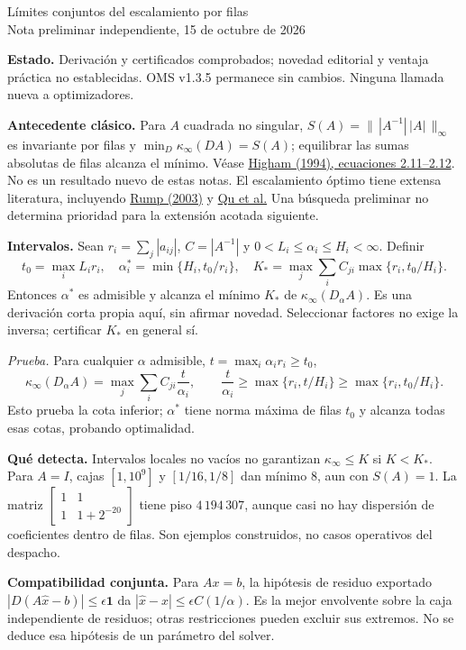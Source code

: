 \documentclass[11pt,a4paper]{article}
\begin{document}
\begin{center}{\Large Límites conjuntos del escalamiento por filas}\\[3pt]
Nota preliminar independiente, 15 de octubre de 2026\end{center}
\textbf{Estado.} Derivación y certificados comprobados; novedad editorial y
ventaja práctica no establecidas. OMS v1.3.5 permanece sin cambios. Ninguna
llamada nueva a optimizadores.

\textbf{Antecedente clásico.} Para $A$ cuadrada no singular,
$S(A)=\|\,|A^{-1}|\,|A|\,\|_\infty$ es invariante por filas y
$\min_D\kappa_\infty(DA)=S(A)$; equilibrar las sumas absolutas de filas alcanza
el mínimo. Véase \href{https://eprints.maths.manchester.ac.uk/651/1/SURVEY.pdf}{Higham (1994), ecuaciones 2.11--2.12}.
No es un resultado nuevo de estas notas. El escalamiento óptimo tiene extensa
literatura, incluyendo \href{https://www.tuhh.de/ti3/paper/rump/Ru03a.pdf}{Rump (2003)}
y \href{https://arxiv.org/abs/2209.00809}{Qu et al.} Una búsqueda preliminar no
determina prioridad para la extensión acotada siguiente.

\textbf{Intervalos.} Sean $r_i=\sum_j|a_{ij}|$, $C=|A^{-1}|$ y
$0<L_i\leq\alpha_i\leq H_i<\infty$. Definir
\[
 t_0=\max_i L_i r_i,\quad
 \alpha_i^*=\min\{H_i,t_0/r_i\},\quad
 K_* = \max_j\sum_i C_{ji}\max\{r_i,t_0/H_i\}.
\]
Entonces $\alpha^*$ es admisible y alcanza el mínimo $K_*$ de
$\kappa_\infty(D_\alpha A)$. Es una derivación corta propia aquí, sin afirmar
novedad. Seleccionar factores no exige la inversa; certificar $K_*$ en general sí.

\emph{Prueba.} Para cualquier $\alpha$ admisible, $t=\max_i\alpha_i r_i\geq t_0$,
\[
 \kappa_\infty(D_\alpha A)=\max_j\sum_i C_{ji}\frac{t}{\alpha_i},\qquad
 \frac{t}{\alpha_i}\geq\max\{r_i,t/H_i\}\geq\max\{r_i,t_0/H_i\}.
\]
Esto prueba la cota inferior; $\alpha^*$ tiene norma máxima de filas $t_0$
y alcanza todas esas cotas, probando optimalidad.

\textbf{Qué detecta.} Intervalos locales no vacíos no garantizan
$\kappa_\infty\leq K$ si $K<K_*$. Para $A=I$, cajas $[1,10^9]$ y
$[1/16,1/8]$ dan mínimo $8$, aun con $S(A)=1$. La matriz
$\left[\begin{smallmatrix}1&1\\1&1+2^{-20}\end{smallmatrix}\right]$ tiene
piso $4\,194\,307$, aunque casi no hay dispersión de coeficientes dentro de filas.
Son ejemplos construidos, no casos operativos del despacho.

\newpage
\textbf{Compatibilidad conjunta.} Para $Ax=b$, la hipótesis de residuo
exportado $|D(A\widehat x-b)|\leq\epsilon\mathbf1$ da
$|\widehat x-x|\leq\epsilon C(1/\alpha)$. Es la mejor envolvente sobre la caja
independiente de residuos; otras restricciones pueden excluir sus extremos.
No se deduce esa hipótesis de un parámetro del solver.
\end{document}

